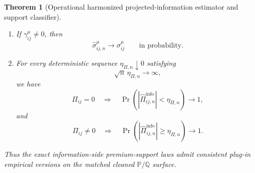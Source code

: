 \documentclass[11pt,a4paper]{amsart}
\theoremstyle{plain}
\newtheorem{theorem}{Theorem}[section]
\theoremstyle{definition}
\theoremstyle{remark}
\newcommand{\PP}{\mathbb{P}}
\newcommand{\QQ}{\mathbb{Q}}
\begin{document}
\begin{theorem}[Operational harmonized projected-information estimator and support classifier]
\begin{enumerate}[label=(\roman*)]
\[{                \widehat{\mathcal I}_{ij,n}^{\PP,\mathrm{harm}}
        },
\]
then
\[
        \widehat\Pi_{ij,n}^{\mathrm{info}}
        =
        \widehat\Pi_{ij,n}
        \qquad\text{identically}.
\]
\item If \(\gamma_{ij}^\mu\neq0\), then
\[
        \widehat\sigma_{ij,n}^\mu\to \sigma_{ij}^\mu
        \qquad\text{in probability}.
\]
\item For every deterministic sequence \(\eta_{\Pi,n}\downarrow0\) satisfying
\[
        \sqrt{n}\,\eta_{\Pi,n}\to\infty,
\]
we have
\[
        \Pi_{ij}=0
        \quad\Longrightarrow\quad
        \Pr\!\left(
                |\widehat\Pi_{ij,n}^{\mathrm{info}}|<\eta_{\Pi,n}
        \right)\to1,
\]
and
\[
        \Pi_{ij}\neq0
        \quad\Longrightarrow\quad
        \Pr\!\left(
                |\widehat\Pi_{ij,n}^{\mathrm{info}}|\ge \eta_{\Pi,n}
        \right)\to1.
\]
\end{enumerate}
Thus the exact information-side premium-support laws admit consistent plug-in empirical versions on
the matched cleaned \(\PP/\QQ\) surface.
\end{theorem}
\end{document}
